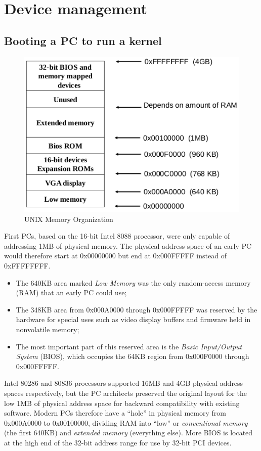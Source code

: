 \chapter{Device management}
\section{Booting a PC to run a kernel}
\begin{figure}[hbtp]
\centering
\includegraphics[scale=0.4]{images/device_management/booting_memory.png}
\caption{UNIX Memory Organization}
\end{figure}

First PCs, based on the 16-bit Intel 8088 processor, were only capable of addressing 1MB of physical memory. The physical address space of an early PC would therefore start at 0x00000000 but end at 0x000FFFFF instead of 0xFFFFFFFF.
\begin{itemize}
\item The 640KB area marked \emph{Low Memory} was the only random-access memory (RAM) that an early PC could use;
\item The 348KB area from 0x000A0000 through 0x000FFFFF was reserved by the hardware for special uses such as video display buffers and firmware held in nonvolatile memory;
\item The most important part of this reserved area is the \emph{Basic Input/Output System} (BIOS), which occupies the 64KB region from 0x000F0000 through 0x000FFFFF.
\end{itemize}

Intel 80286 and 80836 processors supported 16MB and 4GB physical address spaces respectively, but the PC architects preserved the original layout for the low 1MB of physical address space for backward compatibility with existing software. Modern PCs therefore have a ``hole'' in physical memory from 0x000A0000 to 0x00100000, dividing RAM into ``low'' or \emph{conventional memory} (the first 640KB) and \emph{extended memory} (everything else).
More BIOS is located at the high end of the 32-bit address range for use by 32-bit PCI devices.


